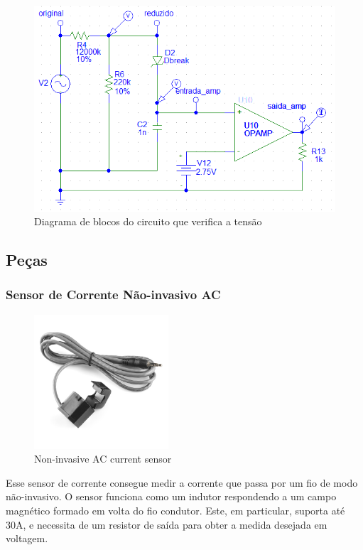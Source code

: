 \begin{figure}[H]
\centering
\includegraphics[width=1\textwidth]{figuras/voltage-circuit.png}
\caption{\label{fig:voltage-circuit} Diagrama de blocos do circuito que verifica a tensão}
\end{figure}
%
\subsection{Peças}
\subsubsection{Sensor de Corrente Não-invasivo AC}
\begin{figure}[H]
\begin{center}
\includegraphics[width=5cm,height=5cm,keepaspectratio]{figuras/sensor.jpg}
\caption{\label{fig:sensor} Non-invasive AC current sensor}
\end{center}
\end{figure}

Esse sensor de corrente consegue medir a corrente que passa por um fio de modo não-invasivo. O sensor funciona como um indutor respondendo a um campo magnético formado em volta do fio condutor. Este, em particular, suporta até 30A, e necessita de um resistor de saída para obter a medida desejada em voltagem.

